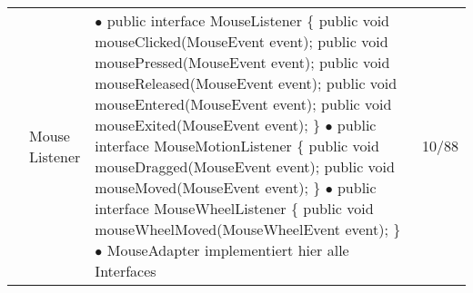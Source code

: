\documentclass[11pt,a4paper]{article}
\begin{document}
\begin{center}
\begin{longtable}[h]{ | p{2.3cm} | p{2.3cm} | p{12.6cm} | p{1.2cm} | }
	& \makecell[l]{Mouse \\ Listener} & \makecell[l]{$\bullet$ public interface MouseListener \{
	\hspace{1cm} public void mouseClicked(MouseEvent event); \\
	\hspace{1cm} public void mousePressed(MouseEvent event); \\
	\hspace{1cm} public void mouseReleased(MouseEvent event); \\
	\hspace{1cm} public void mouseEntered(MouseEvent event); \\
	\hspace{1cm} public void mouseExited(MouseEvent event); \} \\
	$\bullet$ public interface MouseMotionListener \{ \\
	\hspace{1cm} public void mouseDragged(MouseEvent event); \\
	\hspace{1cm} public void mouseMoved(MouseEvent event); \} \\
	$\bullet$ public interface MouseWheelListener \{ \\
	\hspace{1cm} public void mouseWheelMoved(MouseWheelEvent event); \}
	$\bullet$ MouseAdapter implementiert hier alle Interfaces \\ }  & 10/88 \\ \cline{2-4}
	

\end{longtable}
\end{center}
\end{document}
